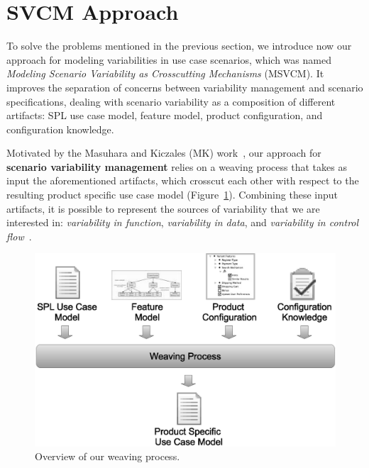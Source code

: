 \section{SVCM Approach}
\label{sec:svmc}

To solve the problems mentioned in the previous section, we introduce now our
approach for modeling variabilities in use case scenarios, which was named
\emph{Modeling Scenario Variability as Crosscutting Mechanisms} (MSVCM). It
improves the separation of concerns between variability management and scenario
specifications, dealing with scenario variability as a composition of different
artifacts: SPL use case model, feature model, product configuration,
and configuration knowledge.

Motivated by the Masuhara and Kiczales (MK) work~\cite{Masuhara:2003aa}, our
approach for \textbf{scenario variability management} relies on a weaving
process that takes as input the aforementioned artifacts, which crosscut
each other with respect to the resulting product specific use case model
(Figure~\ref{fig:weave-process}). Combining these input artifacts, it is possible
to represent the sources of variability that we are interested in:
\emph{variability in function}, \emph{variability in data}, and \emph{variability in
control flow}~\cite{Bachmann:2001aa}.

\begin{figure}[htb]
 \begin{center}
  \includegraphics[scale=0.30]{img/weave-process2.eps}
  \caption{Overview of our weaving process.}
  \label{fig:weave-process}
  \end{center}
\end{figure}

